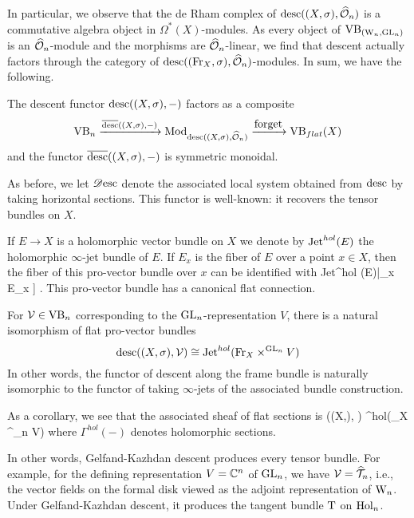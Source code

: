 In particular, we observe that the de Rham complex of ${\rm desc}((X,\sigma),\widehat{\mathcal O}_n)$ is a commutative algebra object in $\Omega^*(X)$-modules. 
As every object of ${\rm VB}_{({{\rm W}_n}, {\rm GL}_n)}$ is an $\widehat{\mathcal O}_n$-module and the morphisms are $\widehat{\mathcal O}_n$-linear, 
we find that descent actually factors through the category of ${\rm desc}(({\rm Fr}_X,\sigma),\widehat{\mathcal O}_n)$-modules. 
In sum, we have the following.

\begin{lem}
The descent functor ${\rm desc}((X,\sigma),-)$ factors as a composite
\[
\VB_n \xto{\overline{\desc}((X,\sigma),-)} \Mod_{\desc((X,\sigma),\hO_n)} \xto{\txt{forget}} \VB_{flat}(X)
\]
and the functor $\overline{{\rm desc}}((X,\sigma),-)$ is symmetric monoidal.
\end{lem}

As before, we let $\mathscr{D}{\rm esc}$ denote the associated local system obtained from ${\rm desc}$ by taking horizontal sections. This functor is well-known: it recovers the tensor bundles on $X$.

If $E \to X$ is a holomorphic vector bundle on $X$ we denote by
${\rm Jet}^{hol}(E)$ the holomorphic $\infty$-jet bundle of $E$. If
$E_x$ is the fiber of $E$ over a point $x \in X$, then the fiber of
this pro-vector bundle over $x$ can be identified with
\ben
{\rm Jet}^{hol} (E)|_{x} \cong E_x \times \CC [[ t_1,\ldots,t_n]] .
\een
This pro-vector bundle has a canonical flat connection.

\begin{prop}
For $\mathcal{V} \in {\rm VB}_n$ corresponding to the ${\rm GL}_n$-representation $V$,
there is a natural isomorphism of flat pro-vector bundles
\[
{\rm desc}((X, \sigma),\mathcal{V}) \cong {\rm Jet}^{hol}({\rm Fr}_X
\times^{{\rm GL}_n} V)
\]
In other words, the functor of descent along the frame bundle is
naturally isomorphic to the functor of taking $\infty$-jets of the associated bundle construction.
\end{prop} 

As a corollary, we see that the associated sheaf of flat sections is
\ben
\sdesc ((X,\sigma), \cV) \cong \Gamma^{hol}(\Fr_X
\times^{\GL_n} V)
\een
where $\Gamma^{hol}(-)$ denotes holomorphic sections. 

In other words, Gelfand-Kazhdan descent produces every tensor bundle. 
For example, for the defining representation $V = \mathbb C^n$ of ${\rm GL}_n$, we have $\mathcal{V} =\widehat{\mathcal T}_n$, 
i.e., the vector fields on the formal disk viewed as the adjoint representation of  ${{\rm W}_n}$. 
Under Gelfand-Kazhdan descent, it produces the tangent bundle ${\rm T}$ on ${\rm Hol}_n$.


